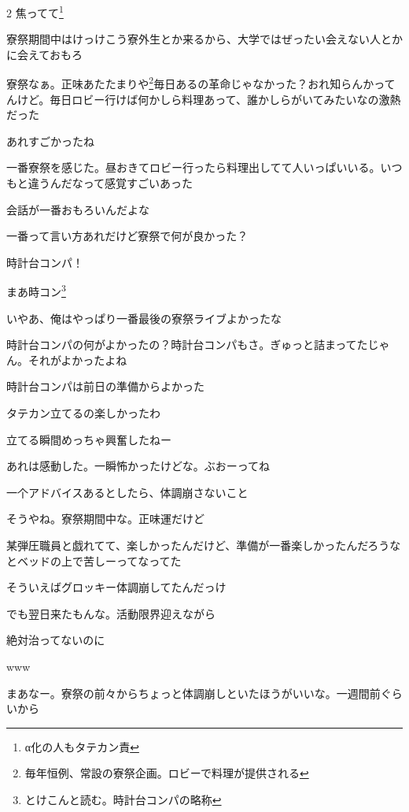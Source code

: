 \begin{multicols}{2}
 焦ってて\footnote{α化の人もタテカン責}

 寮祭期間中はけっけこう寮外生とか来るから、大学ではぜったい会えない人とかに会えておもろ

 寮祭なぁ。正味あたたまりや\footnote{毎年恒例、常設の寮祭企画。ロビーで料理が提供される}毎日あるの革命じゃなかった？おれ知らんかってんけど。毎日ロビー行けば何かしら料理あって、誰かしらがいてみたいなの激熱だった

 あれすごかったね

 一番寮祭を感じた。昼おきてロビー行ったら料理出してて人いっぱいいる。いつもと違うんだなって感覚すごいあった

 会話が一番おもろいんだよな

 一番って言い方あれだけど寮祭で何が良かった？

 時計台コンパ！

 まあ時コン\footnote{とけこんと読む。時計台コンパの略称}

 いやあ、俺はやっぱり一番最後の寮祭ライブよかったな

 時計台コンパの何がよかったの？時計台コンパもさ。ぎゅっと詰まってたじゃん。それがよかったよね

 時計台コンパは前日の準備からよかった

 タテカン立てるの楽しかったわ

 立てる瞬間めっちゃ興奮したねー

 あれは感動した。一瞬怖かったけどな。ぶおーってね

 一个アドバイスあるとしたら、体調崩さないこと

 そうやね。寮祭期間中な。正味運だけど

 某弾圧職員と戯れてて、楽しかったんだけど、準備が一番楽しかったんだろうなとベッドの上で苦しーってなってた

 そういえばグロッキー体調崩してたんだっけ

 でも翌日来たもんな。活動限界迎えながら

 絶対治ってないのに

 www

 まあなー。寮祭の前々からちょっと体調崩しといたほうがいいな。一週間前ぐらいから


\end{multicols}
